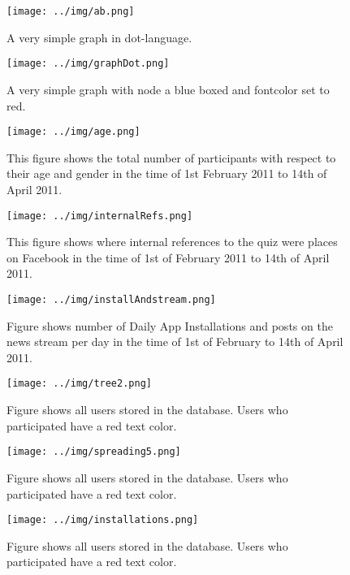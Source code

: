 \documentclass[preprint,12pt]{elsarticle}
\begin{document}
\begin{figure}
  \texttt{[image: ../img/ab.png]}
\caption{A very simple graph in \ac{dot}-language.}
\label{fig:dot}
\end{figure}

\begin{figure}
  \texttt{[image: ../img/graphDot.png]}
\caption{A very simple graph with node a blue boxed and fontcolor set
  to red.}
\label{fig:dot2}
\end{figure}



\begin{figure}
  \texttt{[image: ../img/age.png]}
 \caption{This figure shows the total number of participants with
   respect to their age and gender in the time of 1st February 2011 to
   14th of April 2011.}
\label{fig:age}
\end{figure}

\begin{figure}
  \texttt{[image: ../img/internalRefs.png]}
 \caption{This figure shows where internal references to the quiz were
   places on Facebook in the time of 1st of February 2011 to
   14th of April 2011.}
\label{fig:internalRefs}
\end{figure}

\begin{figure}
  \texttt{[image: ../img/installAndstream.png]}
 \caption{Figure shows number of Daily App Installations and posts on
   the news stream per day in the time of 1st of February to 14th of
   April 2011.}
\label{fig:iAs}
\end{figure}




\begin{figure}
  \texttt{[image: ../img/tree2.png]}
\caption{Figure shows all users stored in the database. Users who
  participated have a red text color.}
\label{fig:tree}
\end{figure}

\begin{figure}
  \texttt{[image: ../img/spreading5.png]}
\caption{Figure shows all users stored in the database. Users who
  participated have a red text color.}
\label{fig:spreading}
\end{figure}

\begin{figure}
  \texttt{[image: ../img/installations.png]}
\caption{Figure shows all users stored in the database. Users who
  participated have a red text color.}
\label{fig:installations}
\end{figure}
\end{document}
